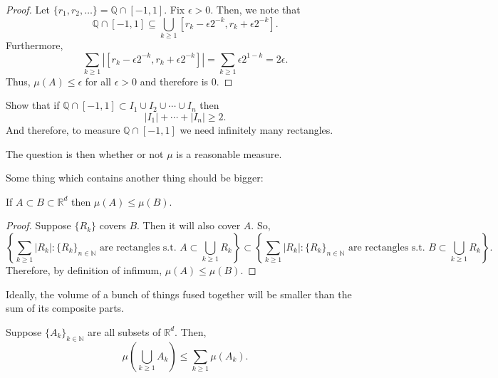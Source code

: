 \documentclass{amsart}
\newcommand{\braces}[1]{\left\{ #1\right\}}
\theoremstyle{definition}
\numberwithin{equation}{section}
\newcommand{\s}[1]{\{#1\}}
\newcommand{\SET}[1]{\braces{#1}}
\newcommand{\N}{\mathbb{N}}
\newcommand{\R}{\mathbb{R}}
\newcommand{\Q}{\mathbb{Q}}
\begin{document}
    \begin{proof}

      Let $\s{r_1, r_2, \ldots} = \Q \cap [-1, 1]$. Fix $\epsilon > 0$. Then, we note that
      \[\Q \cap [-1, 1] \subseteq \bigcup_{k \geq 1}[r_k - \epsilon 2^{-k}, r_k + \epsilon 2^{-k}].\]
      Furthermore,
      \[\sum_{k\geq1}|[r_k - \epsilon 2^{-k}, r_k + \epsilon 2^{-k}]| = \sum_{k\geq1}\epsilon 2^{1-k} = 2\epsilon.\]
      Thus, $\mu(A) \leq \epsilon$ for all $\epsilon > 0$ and therefore is $0.$

    \end{proof}

    \begin{do-this}

      Show that if $\Q \cap [-1, 1] \subset I_1 \cup I_2 \cup \cdots \cup I_n$ then
      \[|I_1| + \cdots + |I_n| \geq 2.\]
      And therefore, to measure $\Q \cap [-1, 1]$ we need infinitely many rectangles.

    \end{do-this}

  The question is then whether or not $\mu$ is a reasonable measure.

  Some thing which contains another thing should be bigger:
  \begin{theorem}

    If $A \subset B \subset \R^d$ then $\mu(A) \leq \mu(B)$.

  \end{theorem}

    \begin{proof}

      Suppose $\s{R_k}$ covers $B$. Then it will also cover $A.$ So,
      \[\SET{\sum_{k \geq 1}|R_k| : \s{R_k}_{n\in\N} \text{ are rectangles s.t. } A \subset \bigcup_{k\geq1}R_k} \subset \SET{\sum_{k \geq 1}|R_k| : \s{R_k}_{n\in\N} \text{ are rectangles s.t. } B \subset \bigcup_{k\geq1}R_k}.\]
      Therefore, by definition of infimum, $\mu(A) \leq \mu(B)$.

    \end{proof}

  Ideally, the volume of a bunch of things fused together will be smaller than the sum of its composite parts.
  \begin{theorem}

    Suppose $\s{A_k}_{k\in\N}$ are all subsets of $\R^d$. Then,
    \[\mu(\bigcup_{k \geq 1}A_k) \leq \sum_{k \geq 1}\mu(A_k).\]

  \end{theorem}
\end{document}
